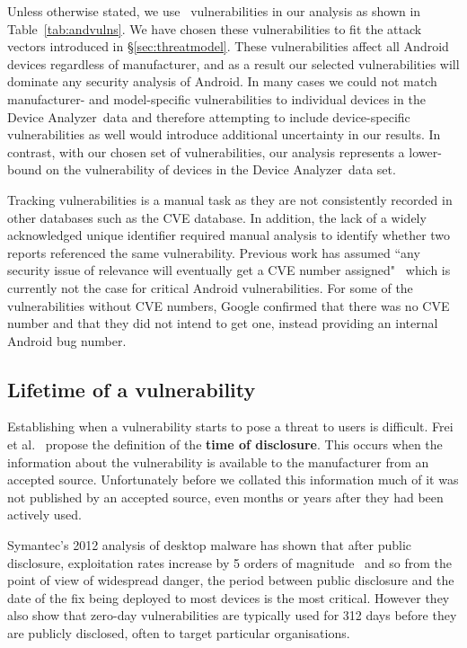 \documentclass{llncs}
\newcommand{\da}{Device Analyzer}
\begin{document}
Unless otherwise stated, we use \daNumVulnsUsed\ vulnerabilities in our analysis as shown in Table~\ref{tab:andvulns}.
We have chosen these vulnerabilities to fit the attack vectors introduced in \S\ref{sec:threatmodel}.
These vulnerabilities affect all Android devices regardless of manufacturer, and as a result our selected vulnerabilities will dominate any security analysis of Android.
In many cases we could not match manufacturer- and model-specific vulnerabilities to individual devices in the \da\ data and therefore attempting to include device-specific vulnerabilities as well would introduce additional uncertainty in our results.
In contrast, with our chosen set of vulnerabilities, our analysis represents a lower-bound on the vulnerability of devices in the \da\ data set.

Tracking vulnerabilities is a manual task as they are not consistently recorded in other databases such as the CVE database.
In addition, the lack of a widely acknowledged unique identifier required manual analysis to identify whether two reports referenced the same vulnerability.
Previous work has assumed ``any security issue of relevance will eventually get a CVE number assigned"~\cite{Frei2010} which is currently not the case for critical Android vulnerabilities.
For some of the vulnerabilities without CVE numbers, Google confirmed that there was no CVE number and that they did not intend to get one, instead providing an internal Android bug number.


\subsection{Lifetime of a vulnerability}

Establishing when a vulnerability starts to pose a threat to users is difficult.
Frei et al.~\cite{Frei2010} propose the definition of the \textbf{time of disclosure}.
This occurs when the information about the vulnerability is available to the manufacturer from an accepted source.
Unfortunately before we collated this information much of it was not published by an accepted source, even months or years after they had been actively used.

Symantec's 2012 analysis of desktop malware has shown that after public disclosure, exploitation rates increase by 5 orders of magnitude~\cite{Bilge2012} and so from the point of view of widespread danger, the period between public disclosure and the date of the fix being deployed to most devices is the most critical.
However they also show that zero-day vulnerabilities are typically used for 312 days before they are publicly disclosed, often to target particular organisations.
\end{document}
